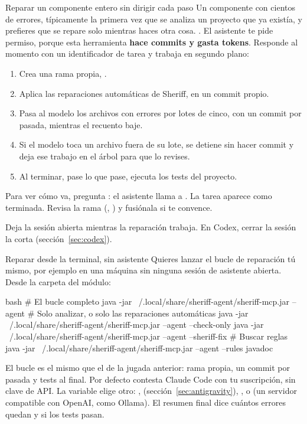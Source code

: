 \documentclass[11pt,a4paper]{article}
\begin{document}
\begin{play}{Reparar un componente entero sin dirigir cada paso}
\when Un componente con cientos de errores, típicamente la primera vez que se
analiza un proyecto que ya existía, y prefieres que se repare solo mientras
haces otra cosa.
\asks {}.
\happens El asistente te pide permiso, porque esta herramienta \textbf{hace
commits y gasta tokens}. Responde al momento con un identificador de tarea y
trabaja en segundo plano:
\begin{enumerate}
  \item Crea una rama propia, .
  \item Aplica las reparaciones automáticas de Sheriff, en un commit propio.
  \item Pasa al modelo los archivos con errores por lotes de cinco, con un commit
        por pasada, mientras el recuento baje.
  \item Si el modelo toca un archivo fuera de su lote, se detiene sin hacer
        commit y deja ese trabajo en el árbol para que lo revises.
  \item Al terminar, pase lo que pase, ejecuta los tests del proyecto.
\end{enumerate}
Para ver cómo va, pregunta : el asistente llama a
.
\done La tarea aparece como terminada. Revisa la rama (,
) y fusiónala si te convence.
\end{play}

\begin{warning}
Deja la sesión abierta mientras la reparación trabaja. En Codex, cerrar la
sesión la corta (sección~\ref{sec:codex}).
\end{warning}

\begin{play}{Reparar desde la terminal, sin asistente}
\when Quieres lanzar el bucle de reparación tú mismo, por ejemplo en una
máquina sin ninguna sesión de asistente abierta.
\asks Desde la carpeta del módulo:
\begin{command}[basicstyle=\ttfamily\footnotesize]{bash}
# El bucle completo
java -jar ~/.local/share/sheriff-agent/sheriff-mcp.jar --agent
# Solo analizar, o solo las reparaciones automáticas
java -jar ~/.local/share/sheriff-agent/sheriff-mcp.jar --agent --check-only
java -jar ~/.local/share/sheriff-agent/sheriff-mcp.jar --agent --sheriff-fix
# Buscar reglas
java -jar ~/.local/share/sheriff-agent/sheriff-mcp.jar --agent --rules javadoc
\end{command}
\happens El bucle es el mismo que el de la jugada anterior: rama propia, un
commit por pasada y tests al final. Por defecto contesta Claude Code con tu
suscripción, sin clave de API. La variable  elige otro:
,  (sección~\ref{sec:antigravity}), ,
 o  (un servidor compatible con OpenAI, como
Ollama).
\done El resumen final dice cuántos errores quedan y si los tests pasan.
\end{play}
\end{document}
